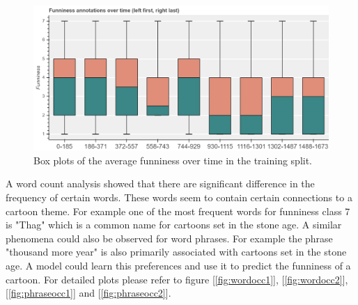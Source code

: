 \documentclass[draft,final,oneside]{vutinfth} %
\begin{document}
\begin{figure}
	\centering
  	\includegraphics[width=1.0\textwidth]{graphics/average_funniness_over_time}
	\caption{Box plots of the average funniness over time in the training split.}
	\label{fig:boxplottime}
\end{figure}

A word count analysis showed that there are significant difference in the frequency of certain words. These words seem to contain certain connections to a cartoon theme. For example one of the most frequent words for funniness class 7 is "Thag" which is a common name for cartoons set in the stone age. A similar phenomena could also be observed for word phrases. For example the phrase "thousand more year" is also primarily associated with cartoons set in the stone age. A model could learn this preferences and use it to predict the funniness of a cartoon. For detailed plots please refer to figure [\ref{fig:wordocc1}], [\ref{fig:wordocc2}], [\ref{fig:phraseocc1}] and [\ref{fig:phraseocc2}].
\end{document}
